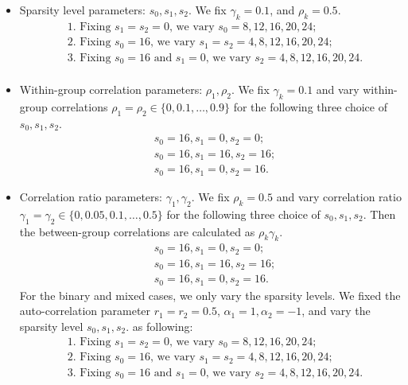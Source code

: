\documentclass[11pt]{article}
\theoremstyle{plain}
\theoremstyle{definition}
\theoremstyle{remark}
\newcommand{\0}{\mathbf{0}}
\begin{document}
\begin{itemize}
\item Sparsity level parameters: $s_0, s_1, s_2.$ We fix $\gamma_k=0.1$, and $\rho_k=0.5$.
 \begin{align*}
        &\text{1. Fixing $s_1 = s_2 =0$, we vary $s_0 = 8,12,16,20,24$;}\\
        &\text{2. Fixing $s_0 =16$, we vary $s_1 = s_2= 4,8,12,16,20,24$;}\\
        &\text{3. Fixing $s_0 =16$ and $s_1=0$, we vary $s_2= 4,8,12,16,20,24$.}\\
    \end{align*}
\item Within-group correlation parameters: $\rho_1, \rho_2$. We fix $\gamma_k=0.1$ and vary within-group correlations $\rho_{1}=\rho_2 \in \{0, 0.1, \dots, 0.9\}$ for the following three choice of $s_0, s_1, s_2$.
\begin{align*}
        & s_0 =16,s_1=0,s_2=0;\\
        & s_0 =16,s_1=16,s_2=16;\\
        & s_0=16,s_1=0,s_2=16.
    \end{align*}

\item Correlation ratio parameters: $\gamma_1, \gamma_2$. We fix $\rho_k=0.5$ and vary correlation ratio $\gamma_1=\gamma_2 \in \{0,0.05,0.1,\dots,0.5\}$ for the following three choice of $s_0, s_1, s_2$. Then the between-group correlations are calculated as $\rho_k\gamma_k$.
\begin{align*}
        & s_0 =16,s_1=0,s_2=0;\\
        & s_0 =16,s_1=16,s_2=16;\\
        & s_0=16,s_1=0,s_2=16.
    \end{align*}
For the binary and mixed cases, we only vary the sparsity levels. We fixed the auto-correlation parameter $r_1=r_2=0.5$, $\alpha_1=1, \alpha_2=-1$, and vary the sparsity level $s_0, s_1, s_2.$ as following:
 \begin{align*}
        &\text{1. Fixing $s_1 = s_2 =0$, we vary $s_0 = 8,12,16,20,24$;}\\
        &\text{2. Fixing $s_0 =16$, we vary $s_1 = s_2= 4,8,12,16,20,24$;}\\
        &\text{3. Fixing $s_0 =16$ and $s_1=0$, we vary $s_2= 4,8,12,16,20,24$.}\\
    \end{align*}
\end{itemize}
\end{document}
